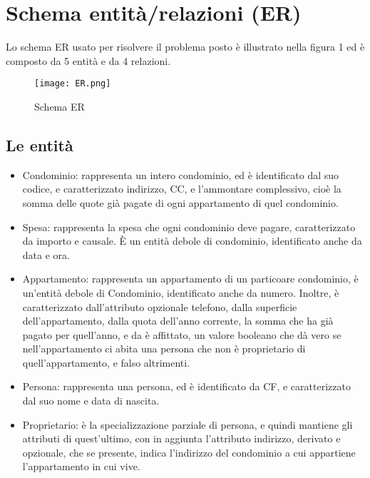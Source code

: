 \section{Schema entità/relazioni (ER)}
\label{schemaER}

Lo schema ER usato per risolvere il problema posto è
illustrato nella figura 1 ed è composto da 5 entità e da 4 relazioni.

\begin{figure}[t]
	\texttt{[image: ER.png]}
	\caption{Schema ER}
\end{figure}

\subsection{Le entità}

\begin{itemize}
    \item Condominio: rappresenta un intero condominio, ed è identificato dal suo codice, e caratterizzato indirizzo, CC, 
                      e l'ammontare complessivo, cioè la somma delle quote già pagate di ogni appartamento di quel condominio.
    \item Spesa: rappresenta la spesa che ogni condominio deve pagare, caratterizzato da importo e causale.
                 È un entità debole di condominio, identificato anche da data e ora.
    \item Appartamento: rappresenta un appartamento di un particoare condominio, è un'entità debole di Condominio, identificato anche da numero.
                        Inoltre, è caratterizzato dall'attributo opzionale telefono, dalla superficie dell'appartamento, 
                        dalla quota dell'anno corrente, la somma che ha già pagato per quell'anno, e da è affittato, un valore booleano
                        che dà vero se nell'appartamento ci abita una persona che non è proprietario di quell'appartamento, e falso altrimenti.
    \item Persona: rappresenta una persona, ed è identificato da CF, e caratterizzato dal suo nome e data di nascita.
    \item Proprietario: è la specializzazione parziale di persona, e quindi mantiene gli attributi di quest'ultimo,
                        con in aggiunta l'attributo indirizzo, derivato e opzionale, che se presente,
                        indica l'indirizzo del condominio a cui appartiene l'appartamento in cui vive.                        
\end{itemize}
